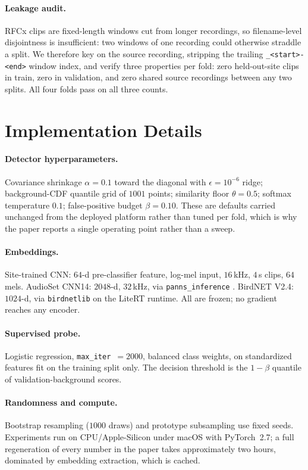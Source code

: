 \documentclass[letterpaper]{article}
\begin{document}
\paragraph{Leakage audit.} RFCx clips are fixed-length windows cut from longer
recordings, so filename-level disjointness is insufficient: two windows of one
recording could otherwise straddle a split. We therefore key on the source
recording, stripping the trailing \texttt{\_<start>-<end>} window index, and
verify three properties per fold: zero held-out-site clips in train, zero in
validation, and zero shared source recordings between any two splits. All four
folds pass on all three counts.

\section{Implementation Details}

\paragraph{Detector hyperparameters.} Covariance shrinkage $\alpha = 0.1$ toward
the diagonal with $\epsilon = 10^{-6}$ ridge; background-CDF quantile grid of
$1001$ points; similarity floor $\theta = 0.5$; softmax temperature $0.1$;
false-positive budget $\beta = 0.10$. These are defaults carried unchanged from
the deployed platform rather than tuned per fold, which is why the paper reports
a single operating point rather than a sweep.

\paragraph{Embeddings.} Site-trained CNN: $64$-d pre-classifier feature, log-mel
input, $16$\,kHz, $4$\,s clips, $64$ mels. AudioSet CNN14: $2048$-d, $32$\,kHz,
via \texttt{panns\_inference} \citep{kong2020panns}. BirdNET V2.4: $1024$-d, via
\texttt{birdnetlib} \citep{kahl2021birdnet} on the LiteRT runtime. All are frozen;
no gradient reaches any encoder.

\paragraph{Supervised probe.} Logistic regression, \texttt{max\_iter}~$=2000$,
balanced class weights, on standardized features fit on the training split only.
The decision threshold is the $1-\beta$ quantile of validation-background scores.

\paragraph{Randomness and compute.} Bootstrap resampling ($1000$ draws) and
prototype subsampling use fixed seeds. Experiments run on CPU/Apple-Silicon under
macOS with PyTorch~2.7; a full regeneration of every number in the paper takes
approximately two hours, dominated by embedding extraction, which is cached.
\end{document}
